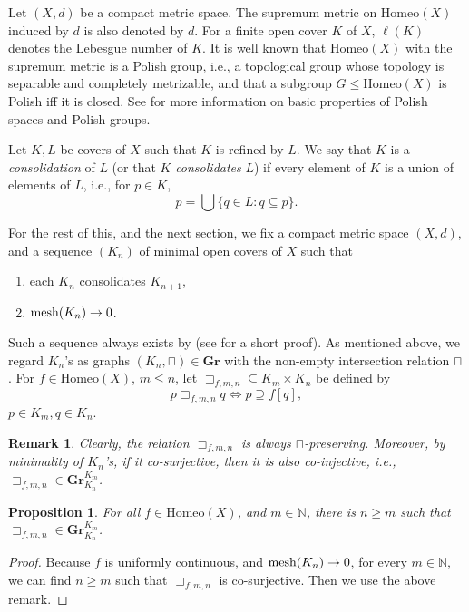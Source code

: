 \documentclass[12pt]{amsart}
\numberwithin{equation}{section}
\theoremstyle{plain}
\newtheorem{remark}[theorem]{\bf Remark}
\newtheorem{proposition}[theorem]{\bf Proposition}
\theoremstyle{definition}
\newcommand \Homeo{ \mbox{Homeo}}
\newcommand \mesh{{\rm{ mesh}}}
\newcommand \sqsp{\sqsupset}
\newcommand \GGRb{\mathbf{Gr}}
\newcommand \NN{\mathbb{N}}
\begin{document}
Let $(X,d)$ be a compact metric space. The supremum metric on $\Homeo(X)$ induced by $d$ is also denoted by $d$. For a finite open cover $K$ of $X$, $\ell(K)$ denotes the Lebesgue number of $K$. It is well known that $\Homeo(X)$ with the supremum metric is a Polish group, i.e., a topological group whose topology is separable and completely metrizable,  and that a subgroup $G \leq \Homeo(X)$ is Polish iff it is closed. See \cite{Gao} for more information on basic properties of Polish spaces and Polish groups. 

Let $K, L$ be covers of $X$ such that $K$ is refined by $L$. We say that $K$ is a \emph{consolidation}  of $L$ (or that $K$ \emph{consolidates} $L$)  if every element of $K$ is a union of elements of $L$, i.e., for $p \in K$,  $$p=\bigcup \{q \in L: q \subseteq p \}.$$ 
 
For the rest of this, and the next section, we fix a compact metric space $(X,d)$, and a sequence $(K_n)$ of minimal open covers of $X$ such that
%
\begin{enumerate}
	\item each $K_n$ consolidates $K_{n+1}$,
	\item $\mesh(K_{n}) \to 0$.
\end{enumerate}
%
Such a sequence always exists by \cite[Theorem 1.34]{BaBiVi} (see \cite[Theorem 3.6]{Ma} for a short proof). As mentioned above, we regard $K_n$'s as graphs $(K_n, \sqcap) \in \GGRb$ with the non-empty intersection relation $\sqcap$.  For $f \in \Homeo(X)$, $m \leq n$, let $\sqsp_{f,m,n} \subseteq K_m \times K_n$ be defined by $$p \sqsp_{f,m,n} q \iff p \supseteq f[q],$$ $p \in K_m, q \in K_n$. 
%
\begin{remark}
Clearly, the relation $\sqsp_{f,m,n}$ is always $\sqcap$-preserving. Moreover, by minimality of $K_n$'s, if it co-surjective, then it is also co-injective, i.e.,  $\sqsp_{f,m,n} \in \GGRb^{K_m}_{K_n}$.
\end{remark}

\begin{proposition}
For all $f\in \Homeo(X)$, and $m \in \NN$, there is $n \geq m$ such that $\sqsp_{f,m,n} \in \GGRb^{K_m}_{K_n}$. 
\end{proposition}

\begin{proof}
	Because $f$ is uniformly continuous, and $\mesh(K_{n}) \to 0$, for every $m \in \NN$, we can find $n \geq m$ such that $\sqsp_{f,m,n}$ is co-surjective. Then we use the above remark.
\end{proof}
\end{document}

